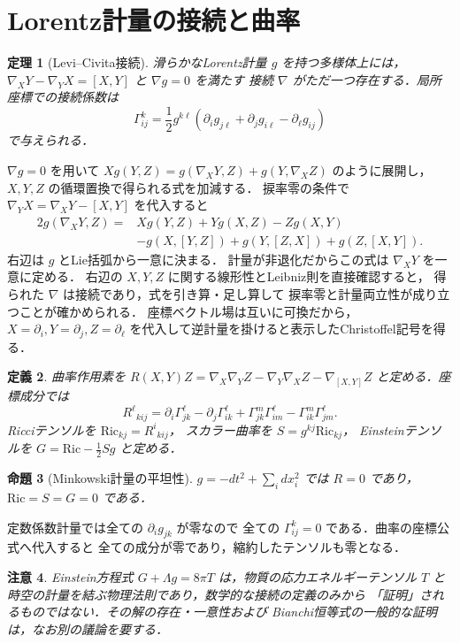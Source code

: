 \documentclass[a5paper,10pt,onecolumn]{jsarticle}
\makeatletter
\theoremstyle{mathnotetheorem}
\newtheorem{theorem}{定理}[section]
\newtheorem{definition}[theorem]{定義}
\newtheorem{proposition}[theorem]{命題}
\newtheorem{remark}[theorem]{注意}
\renewcommand{\proofname}{証明}
\renewenvironment{proof}[1][\proofname]{%
  \par\pushQED{\qed}\normalfont\topsep4\p@\@plus2\p@\relax
  \trivlist\item[\hskip\labelsep\bfseries #1]\ignorespaces
}{\popQED\endtrivlist\@endpefalse}
\makeatother
\begin{document}
\section{Lorentz計量の接続と曲率}
\begin{theorem}[Levi--Civita接続]
滑らかなLorentz計量 $g$ を持つ多様体上には，
$\nabla_XY-\nabla_YX=[X,Y]$ と $\nabla g=0$ を満たす
接続 $\nabla$ がただ一つ存在する．局所座標での接続係数は
\[
 \Gamma^k_{ij}=\frac12g^{k\ell}
 (\partial_i g_{j\ell}+\partial_jg_{i\ell}-\partial_\ell g_{ij})
\]
で与えられる．
\end{theorem}
\begin{proof}
$\nabla g=0$ を用いて
$Xg(Y,Z)=g(\nabla_XY,Z)+g(Y,\nabla_XZ)$ のように展開し，
$X,Y,Z$ の循環置換で得られる式を加減する．
捩率零の条件で $\nabla_YX=\nabla_XY-[X,Y]$ を代入すると
\[
\begin{aligned}
2g(\nabla_XY,Z)={}&Xg(Y,Z)+Yg(X,Z)-Zg(X,Y)\\
 &-g(X,[Y,Z])+g(Y,[Z,X])+g(Z,[X,Y]).
\end{aligned}
\]
右辺は $g$ とLie括弧から一意に決まる．
計量が非退化だからこの式は $\nabla_XY$ を一意に定める．
右辺の $X,Y,Z$ に関する線形性とLeibniz則を直接確認すると，
得られた $\nabla$ は接続であり，式を引き算・足し算して
捩率零と計量両立性が成り立つことが確かめられる．
座標ベクトル場は互いに可換だから，$X=\partial_i,Y=\partial_j,Z=\partial_\ell$
を代入して逆計量を掛けると表示したChristoffel記号を得る．
\end{proof}
\begin{definition}
曲率作用素を
$R(X,Y)Z=\nabla_X\nabla_YZ-\nabla_Y\nabla_XZ-\nabla_{[X,Y]}Z$
と定める．座標成分では
\[
 R^\ell{}_{kij}=\partial_i\Gamma^\ell_{jk}
 -\partial_j\Gamma^\ell_{ik}
 +\Gamma^m_{jk}\Gamma^\ell_{im}
 -\Gamma^m_{ik}\Gamma^\ell_{jm}.
\]
Ricciテンソルを $\mathrm{Ric}_{kj}=R^i{}_{kij}$，
スカラー曲率を $S=g^{kj}\mathrm{Ric}_{kj}$，
Einsteinテンソルを $G=\mathrm{Ric}-\tfrac12Sg$ と定める．
\end{definition}
\begin{proposition}[Minkowski計量の平坦性]
$g=-dt^2+\sum_i dx_i^2$ では $R=0$ であり，
$\mathrm{Ric}=S=G=0$ である．
\end{proposition}
\begin{proof}
定数係数計量では全ての $\partial_i g_{jk}$ が零なので
全ての $\Gamma^k_{ij}=0$ である．曲率の座標公式へ代入すると
全ての成分が零であり，縮約したテンソルも零となる．
\end{proof}
\begin{remark}
Einstein方程式 $G+\Lambda g=8\pi T$ は，物質の応力エネルギーテンソル
$T$ と時空の計量を結ぶ物理法則であり，数学的な接続の定義のみから
「証明」されるものではない．その解の存在・一意性および
Bianchi恒等式の一般的な証明は，なお別の議論を要する．
\end{remark}
\end{document}
